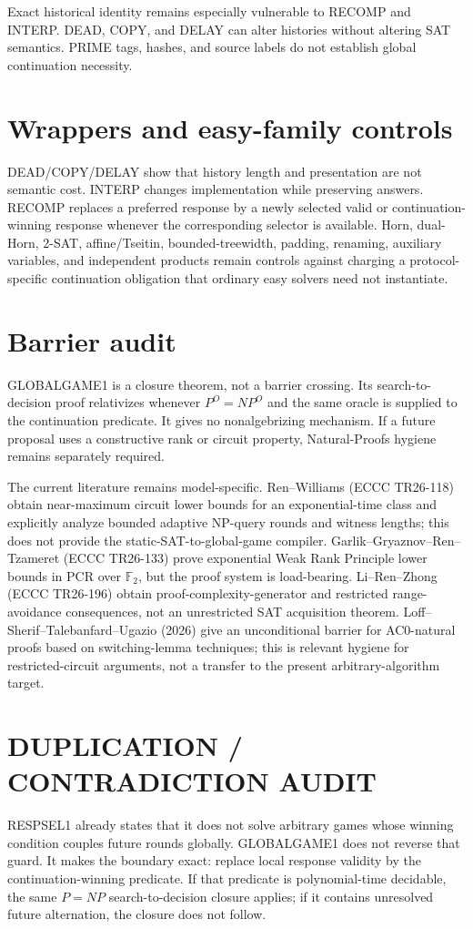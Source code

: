 \documentclass[11pt]{article}
\begin{document}
Exact historical identity remains especially vulnerable to RECOMP and INTERP. DEAD, COPY, and DELAY can alter histories without altering SAT semantics. PRIME tags, hashes, and source labels do not establish global continuation necessity.

\section*{Wrappers and easy-family controls}
DEAD/COPY/DELAY show that history length and presentation are not semantic cost. INTERP changes implementation while preserving answers. RECOMP replaces a preferred response by a newly selected valid or continuation-winning response whenever the corresponding selector is available. Horn, dual-Horn, 2-SAT, affine/Tseitin, bounded-treewidth, padding, renaming, auxiliary variables, and independent products remain controls against charging a protocol-specific continuation obligation that ordinary easy solvers need not instantiate.

\section*{Barrier audit}
GLOBALGAME1 is a closure theorem, not a barrier crossing. Its search-to-decision proof relativizes whenever \(P^O=NP^O\) and the same oracle is supplied to the continuation predicate. It gives no nonalgebrizing mechanism. If a future proposal uses a constructive rank or circuit property, Natural-Proofs hygiene remains separately required.

The current literature remains model-specific. Ren--Williams (ECCC TR26-118) obtain near-maximum circuit lower bounds for an exponential-time class and explicitly analyze bounded adaptive NP-query rounds and witness lengths; this does not provide the static-SAT-to-global-game compiler. Garlik--Gryaznov--Ren--Tzameret (ECCC TR26-133) prove exponential Weak Rank Principle lower bounds in PCR over \(\mathbb F_2\), but the proof system is load-bearing. Li--Ren--Zhong (ECCC TR26-196) obtain proof-complexity-generator and restricted range-avoidance consequences, not an unrestricted SAT acquisition theorem. Loff--Sherif--Talebanfard--Ugazio (2026) give an unconditional barrier for AC0-natural proofs based on switching-lemma techniques; this is relevant hygiene for restricted-circuit arguments, not a transfer to the present arbitrary-algorithm target.

\section*{DUPLICATION / CONTRADICTION AUDIT}
RESPSEL1 already states that it does not solve arbitrary games whose winning condition couples future rounds globally. GLOBALGAME1 does not reverse that guard. It makes the boundary exact: replace local response validity by the continuation-winning predicate. If that predicate is polynomial-time decidable, the same \(P=NP\) search-to-decision closure applies; if it contains unresolved future alternation, the closure does not follow.
\end{document}
